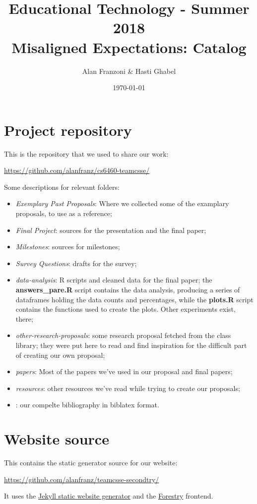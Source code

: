 \documentclass[12pt,a4paper,titlepage]{article}
\title{\blue Educational Technology - Summer 2018 \\
\blueb Misaligned Expectations: Catalog}
\author{Alan Franzoni & Hasti Ghabel}
\date{\today}
\begin{document}
\maketitle

\section* {Project repository}

This is the repository that we used to share our work:\newline

\url{https://github.com/alanfranz/cs6460-teamcsse/}\newline

Some descriptions for relevant folders:
\begin{itemize}
\item \textit{Exemplary Past Proposals}: Where we collected some of the examplary proposals, to use as a reference;
\item \textit{Final Project}: sources for the presentation and the final paper;
\item \textit{Milestones}: sources for milestones;
\item \textit{Survey Questions}: drafts for the survey;
\item \textit{data-analysis}: R scripts and cleaned data for the final paper; the \textbf{answers\_pare.R} script contains the data analysis, producing a series of dataframes holding the data counts and percentages, while the \textbf{plots.R} script contains the functions used to create the plots. Other experiments exist, there;
\item \textit{other-research-proposals}: some research proposal fetched from the class library; they were put here to read and find inspiration for the difficult part of creating our own proposal;
\item \textit{papers}: Most of the papers we've used in our proposal and final papers;
\item \textit{resources}: other resources we've read while trying to create our proposals;
\item {}: our compelte bibliography in biblatex format.
\end{itemize}


\section* {Website source}

This contains the static generator source for our website:\newline

\url{https://github.com/alanfranz/teamcsse-secondtry/}\newline

It uses the \href{http://jekyllrb.com/}{Jekyll static website generator} and  the \href{https://forestry.io/}{Forestry} frontend.
\end{document}
